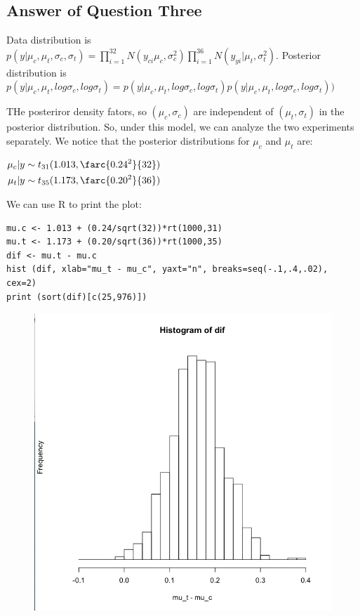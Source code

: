 \documentclass[]{article}
\begin{document}
\subsection{Answer of Question Three} \label{answer-3}

Data distribution is $p(y | \mu_c, \mu_t, \sigma_c, \sigma_t) = \prod_{i = 1}^32 N(y_{ci}\mu_c, \sigma_c^2) \prod_{i=1}^36 N(y_{yi}|\mu_t,\sigma_t^2).$ Posterior distribution is $p(y | \mu_c, \mu_t, log \sigma_c, log \sigma_t) = p(y | \mu_c, \mu_t, log \sigma_c, log \sigma_t)p(y|\mu_c, \mu_t, log \sigma_c, log \sigma_t))$

THe posteriror density fators, so $(\mu_c, \sigma_c)$ are independent of $(\mu_t, \sigma_t)$ in the posterior distribution. So, under this model, we can analyze the two experiments separately. We notice that the posterior distributions for $\mu_c$ and $\mu_t$ are:

$\begin{align*}
\mu_c|y \sim t_{31}(1.013, \farc{0.24^2}{32})\\
\mu_t|y \sim t_{35}(1.173, \farc{0.20^2}{36})
\end{align*}$

We can use R to print the plot:

\begin{Verbatim}
mu.c <- 1.013 + (0.24/sqrt(32))*rt(1000,31)
mu.t <- 1.173 + (0.20/sqrt(36))*rt(1000,35)
dif <- mu.t - mu.c
hist (dif, xlab="mu_t - mu_c", yaxt="n", breaks=seq(-.1,.4,.02), cex=2)
print (sort(dif)[c(25,976)])
\end{Verbatim}

\begin{figure}[H]
  \includegraphics{question3.png}
  \caption{}
  \label{}
\end{figure}
\end{document}
